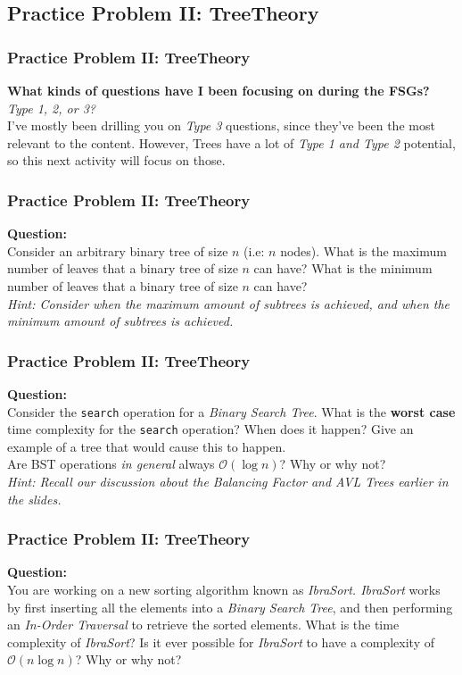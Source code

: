 \documentclass[hyperref={colorlinks,citecolor=blue,linkcolor=blue,urlcolor=blue}, aspectratio=1610]{beamer}
\begin{document}
\subsection{Practice Problem II: TreeTheory}
\begin{frame}
  \frametitle{Practice Problem II: TreeTheory}
  
  \textbf{What kinds of questions have I been focusing on during the FSGs?} \\
  \textit{Type 1, 2, or 3?} \\
  I've mostly been drilling you on \textit{Type 3} questions, since they've been the most relevant to the content. However, Trees have a lot of \textit{Type 1 and Type 2} potential, so this next activity will focus on those.\\
\end{frame}

\begin{frame}
  \frametitle{Practice Problem II: TreeTheory}
  \textbf{Question:} \\
  Consider an arbitrary binary tree of size $n$ (i.e: $n$ nodes). What is the maximum number of leaves that a binary tree of size $n$ can have? What is the minimum number of leaves that a binary tree of size $n$ can have? \\
  \textit{Hint: Consider when the maximum amount of subtrees is achieved, and when the minimum amount of subtrees is achieved.}
\end{frame}

\begin{frame}
  \frametitle{Practice Problem II: TreeTheory}
  \textbf{Question:} \\
  Consider the \texttt{search} operation for a \textit{Binary Search Tree}. What is the \textbf{worst case} time complexity for the \texttt{search} operation? When does it happen? Give an example of a tree that would cause this to happen. \\
  Are BST operations \textit{in general} always $\mathcal{O}(\log n)$? Why or why not? \\
  \textit{Hint: Recall our discussion about the \textit{Balancing Factor} and \textit{AVL Trees} earlier in the slides.}
\end{frame}

\begin{frame}
  \frametitle{Practice Problem II: TreeTheory}
  \textbf{Question:} \\
  You are working on a new sorting algorithm known as \textit{IbraSort. IbraSort} works by first inserting all the elements into a \textit{Binary Search Tree}, and then performing an \textit{In-Order Traversal} to retrieve the sorted elements. What is the time complexity of \textit{IbraSort}? Is it ever possible for \textit{IbraSort} to have a complexity of $\mathcal{O}(n \log n)$? Why or why not?
\end{frame}
\end{document}
